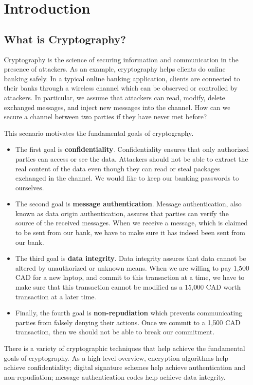 \section{Introduction}

\subsection{What is Cryptography?}
Cryptography is the science of securing information and communication in the presence of attackers. As an example, cryptography helps clients do online banking safely. In a typical online banking application, clients are connected to their banks through a wireless channel which can be observed or controlled by attackers. In particular, we assume that attackers can read, modify, delete exchanged messages, and inject new messages into the channel. How can we secure a channel between two parties if they have never met before?

This scenario motivates the fundamental goals of cryptography.
\begin{itemize}
    \item The first goal is {\bf confidentiality}. Confidentiality ensures that only authorized parties can access or see the data. Attackers should not be able to extract the real content of the data even though they can read or steal packages exchanged in the channel. We would like to keep our banking passwords to ourselves.
    \item The second goal is {\bf message authentication}. Message authentication, also known as data origin authentication, assures that parties can verify the source of the received messages. When we receive a message, which is claimed to be sent from our bank, we have to make sure it has indeed been sent from our bank.
    \item The third goal is {\bf data integrity}. Data integrity assures that data cannot be altered by unauthorized or unknown means. When we are willing to pay 1,500 CAD for a new laptop, and commit to this transaction at a time, we have to make sure that this transaction cannot be modified as a 15,000 CAD worth transaction at a later time.
    \item Finally, the fourth goal is {\bf non-repudiation} which prevents communicating parties from falsely denying their actions. Once we commit to a 1,500 CAD transaction, then we should not be able to break our commitment.
\end{itemize}

There is a variety of cryptographic techniques that help achieve the fundamental goals of cryptography. As a high-level overview, encryption algorithms help achieve confidentiality; digital signature schemes help achieve authentication and non-repudiation; message authentication codes help achieve data integrity.

